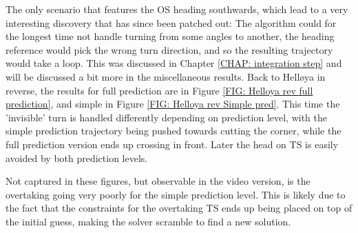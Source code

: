 The only scenario that features the OS heading southwards, which lead to a very interesting discovery that has since been patched out: The algorithm could for the longest
time not handle turning from some angles to another, the heading reference would pick the wrong turn direction, and so the resulting trajectory would take a loop. 
This was discussed in Chapter \ref{CHAP: integration step} and will be discussed a bit more in the miscellaneous results. 
Back to Helløya in reverse, the results for full prediction are in Figure \ref{FIG: Helloya rev full prediction}, 
and simple in Figure \ref{FIG: Helloya rev Simple pred}. This time the 'invisible' turn is handled differently depending on prediction level, with
the simple prediction trajectory being pushed towards cutting the corner, while the full prediction version ends up crossing in front. Later the head on
TS is easily avoided by both prediction levels.

Not captured in these figures, but observable in the video version, is the 
overtaking going very poorly for the simple prediction level. This is likely due to the fact that the
constraints for the overtaking TS ends up being placed on top of the initial guess, making the solver scramble to find a new solution.


